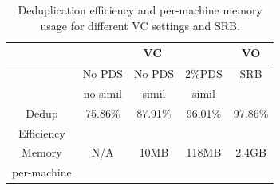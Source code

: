 \begin{table}[htb]
\centering
    \begin{tabular}{|c|c|c|c|c|}
    \hline 
&
     \multicolumn{3}{|c|}{VC}  & VO \\ \hline
&       No PDS & No PDS &  2\%PDS     &   SRB  \\ 
&       no simil &simil   &  simil    &\\ \hline
Dedup & 75.86\%    &87.91\%  & 96.01\%   & 97.86\% \\ 
Efficiency & &           &       &                 \\    \hline 
Memory &     N/A&   10MB & 118MB  & 2.4GB \\ 
per-machine & &     &   &    \\ \hline
    \end{tabular}
    \caption{Deduplication efficiency and per-machine memory usage for different VC settings and
        SRB.}
    \label{tab:efficiency-comparison}
\end{table}


